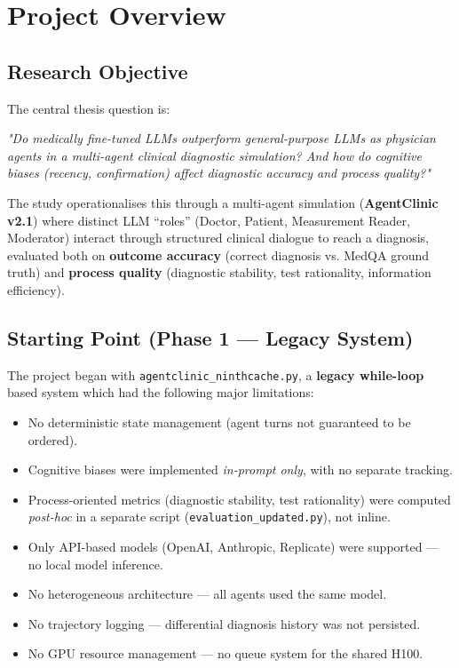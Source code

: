 \documentclass[12pt, a4paper]{article}
\begin{document}
\newpage

\section{Project Overview}

\subsection{Research Objective}

The central thesis question is:

\begin{mdframed}[backgroundcolor=noteblue, linecolor=iitblue, linewidth=1.5pt]
\textit{"Do medically fine-tuned LLMs outperform general-purpose LLMs as physician agents in a multi-agent clinical diagnostic simulation? And how do cognitive biases (recency, confirmation) affect diagnostic accuracy and process quality?"}
\end{mdframed}

\vspace{0.5em}
The study operationalises this through a multi-agent simulation (\textbf{AgentClinic v2.1}) where distinct LLM ``roles'' (Doctor, Patient, Measurement Reader, Moderator) interact through structured clinical dialogue to reach a diagnosis, evaluated both on \textbf{outcome accuracy} (correct diagnosis vs. MedQA ground truth) and \textbf{process quality} (diagnostic stability, test rationality, information efficiency).

\subsection{Starting Point (Phase 1 — Legacy System)}

The project began with \texttt{agentclinic\_ninthcache.py}, a \textbf{legacy while-loop} based system which had the following major limitations:
\begin{itemize}
    \item No deterministic state management (agent turns not guaranteed to be ordered).
    \item Cognitive biases were implemented \textit{in-prompt only}, with no separate tracking.
    \item Process-oriented metrics (diagnostic stability, test rationality) were computed \textit{post-hoc} in a separate script (\texttt{evaluation\_updated.py}), not inline.
    \item Only API-based models (OpenAI, Anthropic, Replicate) were supported — no local model inference.
    \item No heterogeneous architecture — all agents used the same model.
    \item No trajectory logging — differential diagnosis history was not persisted.
    \item No GPU resource management — no queue system for the shared H100.
\end{itemize}
\end{document}
